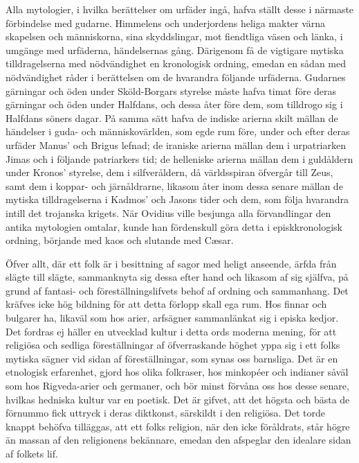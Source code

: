 Alla mytologier, i hvilka berättelser om urfäder ingå, hafva ställt
desse i närmaste förbindelse med gudarne. Himmelens och underjordens
heliga makter värna skapelsen och människorna, sina skyddslingar, mot
fiendtliga väsen och länka, i umgänge med urfäderna, händelsernas gång.
Därigenom få de vigtigare mytiska tilldragelserna med nödvändighet en
kronologisk ordning, emedan en sådan med nödvändighet råder i
berättelsen om de hvarandra följande urfäderna. Gudarnes gärningar och
öden under Sköld-Borgars styrelse måste hafva timat före deras gärningar
och öden under Halfdans, och dessa åter före dem, som tilldrogo sig i
Halfdans söners dagar. På samma sätt hafva de indiske arierna skilt
mällan de händelser i guda- och människovärlden, som egde rum före,
under och efter deras urfäder Manus' och Brigus lefnad; de iraniske
arierna mällan dem i urpatriarken Jimas och i följande patriarkers tid;
de helleniske arierna mällan dem i guldåldern under Kronos' styrelse,
dem i silfveråldern, då världsspiran öfvergår till Zeus, samt dem i
koppar- och järnåldrarne, likasom åter inom dessa senare mällan de
mytiska tilldragelserna i Kadmos' och Jasons tider och dem, som följa
hvarandra intill det trojanska krigets. När Ovidius ville besjunga alla
förvandlingar den antika mytologien omtalar, kunde han fördenskull göra
detta i episkkronologisk ordning, börjande med kaos och slutande med
Cæsar.

Öfver allt, där ett folk är i besittning af sagor med heligt anseende,
ärfda från slägte till slägte, sammanknyta sig dessa efter hand och
likasom af sig själfva, på grund af fantasi- och föreställningslifvets
behof af ordning och sammanhang. Det kräfves icke hög bildning för att
detta förlopp skall ega rum. Hos finnar och bulgarer ha, likaväl som hos
arier, arfsägner sammanlänkat sig i episka kedjor. Det fordras ej häller
en utvecklad kultur i detta ords moderna mening, för att religiösa och
sedliga föreställningar af öfverraskande höghet yppa sig i ett folks
mytiska sägner vid sidan af föreställningar, som synas oss barnsliga.
Det är en etnologisk erfarenhet, gjord hos olika folkraser, hos
minkopéer och indianer såväl som hos Rigveda-arier och germaner, och bör
minst förvåna oss hos desse senare, hvilkas hedniska kultur var en
poetisk. Det är gifvet, att det högsta och bästa de förnummo fick
uttryck i deras diktkonst, särskildt i den religiösa. Det torde knappt
behöfva tilläggas, att ett folks religion, när den icke föråldrats, står
högre än massan af den religionens bekännare, emedan den afspeglar den
idealare sidan af folkets lif.

